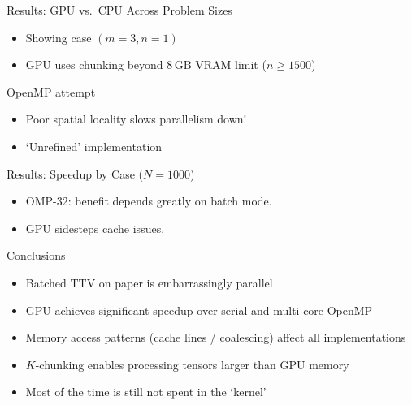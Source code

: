 \documentclass{beamer}
\begin{document}
\begin{frame}{Results: GPU vs.\ CPU Across Problem Sizes}

\begin{center}
\resizebox{0.95\linewidth}{!}{}
\end{center}

\begin{itemize}
  \item Showing case $(m{=}3, n{=}1)$
  \item GPU uses chunking beyond 8\,GB VRAM limit ($n\geq 1500$)
\end{itemize}

\end{frame}

\begin{frame}{OpenMP attempt}
\begin{itemize}
  \item Poor spatial locality slows parallelism down!
  \item `Unrefined' implementation
\end{itemize}


\begin{center}
\resizebox{0.95\linewidth}{!}{}
\end{center}

\end{frame}


\begin{frame}{Results: Speedup by Case ($N = 1000$)}

\begin{center}
\resizebox{0.85\linewidth}{!}{}
\end{center}

\begin{itemize}
  \item OMP-32: benefit depends greatly on batch mode.
  \item GPU sidesteps cache issues.
\end{itemize}

\end{frame}

\begin{frame}{Conclusions}

\begin{itemize}
  \item Batched TTV on paper is embarrassingly parallel
  \item GPU achieves significant speedup over serial and multi-core OpenMP
  \item Memory access patterns (cache lines / coalescing) affect all implementations
  \item $K$-chunking enables processing tensors larger than GPU memory
  \item Most of the time is still not spent in the `kernel'
\end{itemize}

\end{frame}
\end{document}
